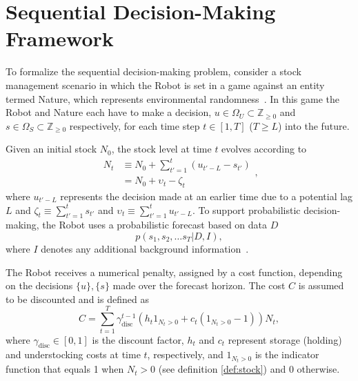 \section{Sequential Decision-Making Framework}
To formalize the sequential decision-making problem, consider a stock management scenario in which the Robot is set in a game against an entity termed Nature, which represents environmental randomness~\citep{lavalle2006}. In this game the Robot and Nature each have to make a decision, $u\in \Omega_U\subset \mathbb{Z}_{\geq 0}$ and $s\in \Omega_S\subset \mathbb{Z}_{\geq 0}$ respectively, for each time step $t\in [1,T]$ ($T\geq L$) into the future. 
\begin{definition}
	\label{def:stock}
	Given an initial stock $N_0$, the stock level at time $t$ evolves according to
	\begin{equation}
		\begin{split}
			N_t &\equiv N_0 + \sum_{t'=1}^{t} (u_{t'-L} - s_{t'})\\
			& = N_0+\upsilon_t-\zeta_t
		\end{split},
	\end{equation}
	where $u_{t'-L}$ represents the decision made at an earlier time due to a potential lag $L$ and $\zeta_t\equiv \sum_{t'=1}^ts_{t'}$ and $\upsilon_t\equiv \sum_{t'=1}^tu_{t'-L}$. To support probabilistic decision-making, the Robot uses a probabilistic forecast based on data $D$
	\begin{equation}
		p(s_1, s_2, \dots s_T| D, I),
	\end{equation}
	where $I$ denotes any additional background information~\citep{Sivia2006}.
\end{definition}

\begin{definition}
	\label{def:cost}
	The Robot receives a numerical penalty, assigned by a cost function, depending on the decisions $\{u\}, \{s\}$ made over the forecast horizon. The cost $C$ is assumed to be discounted and is defined as
	\begin{equation}
		C = \sum_{t=1}^{T} \gamma_{\text{disc}}^{t-1} 
		\left( h_t 1_{N_t > 0} + c_t (1_{N_t > 0} - 1) \right) N_t,
		\label{eq:cost}
	\end{equation}
	where $\gamma_{\text{disc}} \in [0,1]$ is the discount factor, $h_t$ and $c_t$ represent 
	storage (holding) and understocking costs at time $t$, respectively, and 
	$1_{N_t > 0}$ is the indicator function that equals 1 when $N_t > 0$ (see definition \ref{def:stock}) and $0$ otherwise.
\end{definition}

